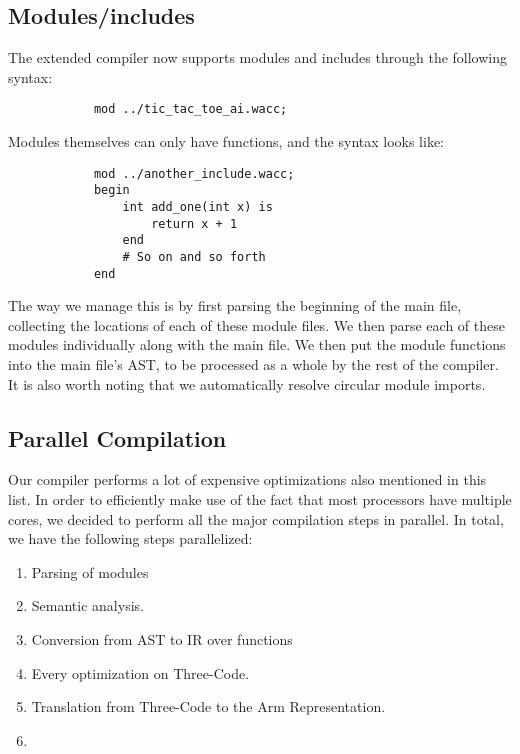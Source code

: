 \documentclass{article}
\begin{document}
        \subsection*{Modules/includes}
        The extended compiler now supports modules and includes through the following syntax:
        \begin{verbatim}
            mod ../tic_tac_toe_ai.wacc;
        \end{verbatim}
        Modules themselves can only have functions, and the syntax looks like:
        \begin{verbatim}
            mod ../another_include.wacc;
            begin
                int add_one(int x) is
                    return x + 1
                end
                # So on and so forth
            end
        \end{verbatim}
        The way we manage this is by first parsing the beginning of the main file, collecting the locations of each of these module files. We then parse each of these modules individually along with the main file. We then put the module functions into the main file's AST, to be processed as a whole by the rest of the compiler. It is also worth noting that we automatically resolve circular module imports.
        
        \subsection{Parallel Compilation}
        Our compiler performs a lot of expensive optimizations also mentioned in this list. In order to efficiently make use of the fact that most processors have multiple cores, we decided to perform all the major compilation steps in parallel. In total, we have the following steps parallelized:
        \begin{enumerate}
            \item Parsing of modules
            \item Semantic analysis.
            \item Conversion from AST to IR over functions
            \item Every optimization on Three-Code.
            \item Translation from Three-Code to the Arm Representation.
            \item 
        \end{enumerate}
        

    
\end{document}
